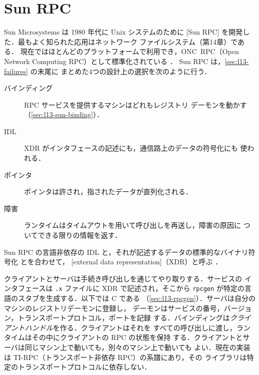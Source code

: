 \documentclass[../main.tex]{subfiles}
\begin{document}
\section{Sun RPC}
\label{sec:l13-sunrpc}

Sun Microsystems は 1980 年代に Unix システムのために
[Sun RPC] を開発した．最もよく知られた応用はネットワーク
ファイルシステム（第14章）である．
現在ではほとんどのプラットフォームで利用でき，ONC~RPC（Open Network
Computing RPC）として標準化されている \cite{rfc5531}．%
Sun RPC は，\cref{sec:l13-failures} の末尾に
まとめた4つの設計上の選択を次のように行う．
\begin{description}
  \item[バインディング] RPC サービスを提供するマシンはどれもレジストリ
    デーモンを動かす（\cref{sec:l13-sun-binding}）．
  \item[IDL] XDR がインタフェースの記述にも，通信路上のデータの符号化にも
    使われる．
  \item[ポインタ] ポインタは許され，指されたデータが直列化される．
  \item[障害] ランタイムはタイムアウトを用いて呼び出しを再送し，障害の原因に
    ついてできる限りの情報を返す．
\end{description}

\begin{definition}[外部データ表現]
  Sun RPC の言語非依存の IDL と，それが記述するデータの標準的なバイナリ符号化
  とを合わせて，%
  [external data representation]（XDR）と呼ぶ \cite{rfc4506}．
\end{definition}

クライアントとサーバは手続き呼び出しを通じてやり取りする．サービスの
インタフェースは \texttt{.x} ファイルに XDR で記述され，そこから
\texttt{rpcgen} が特定の言語のスタブを生成する．以下では C である
（\cref{sec:l13-rpcgen}）．サーバは自分のマシンのレジストリデーモンに登録し，
デーモンはサービスの番号，バージョン，トランスポートプロトコル，ポートを記録
する．バインディングは\emph{クライアントハンドル}を作る．クライアントはそれを
すべての呼び出しに渡し，ランタイムはその中にクライアントの RPC の状態を保持
する．クライアントとサーバは同じマシン上で動いても，別々のマシン上で動いても
よい．現在の実装は TI-RPC（トランスポート非依存 RPC）の系譜にあり，その
ライブラリは特定のトランスポートプロトコルに依存しない．
\end{document}
